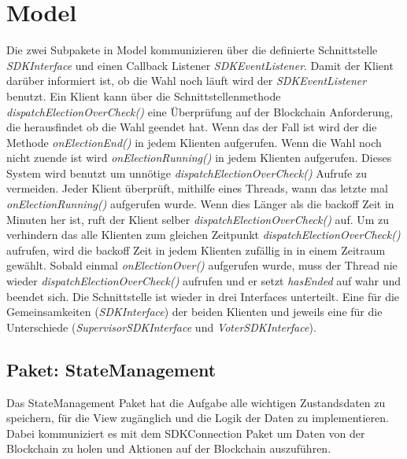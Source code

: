 \documentclass[parskip=full]{scrartcl}
\newcommand{\textitx}[1]{\mbox{\textit{#1}}}
\begin{document}
	\section{Model}
	\pagestyle{plain}
	Die zwei Subpakete in Model kommunizieren über die definierte Schnittstelle \textitx{SDKInterface} und einen Callback Listener \textitx{SDKEventListener}. 
	Damit der Klient darüber informiert ist, ob die Wahl noch läuft wird der \textitx{SDKEventListener} benutzt. Ein Klient kann über die Schnittstellenmethode \textitx{dispatchElectionOverCheck()} eine Überprüfung auf der Blockchain Anforderung, die herausfindet ob die Wahl geendet hat. Wenn das der Fall ist wird der die Methode \textitx{onElectionEnd()} in jedem Klienten aufgerufen. Wenn die Wahl noch nicht zuende ist wird \textitx{onElectionRunning()} in jedem Klienten aufgerufen. Dieses System wird benutzt um unnötige \textitx{dispatchElectionOverCheck()} Aufrufe zu vermeiden. Jeder Klient überprüft, mithilfe eines Threads, wann das letzte mal \textitx{onElectionRunning()} aufgerufen wurde. Wenn dies Länger als die backoff Zeit in Minuten her ist, ruft der Klient selber \textitx{dispatchElectionOverCheck()} auf. Um zu verhindern das alle Klienten zum gleichen Zeitpunkt \textitx{dispatchElectionOverCheck()} aufrufen, wird die backoff Zeit in jedem Klienten zufällig in in einem Zeitraum gewählt. Sobald einmal \textitx{onElectionOver()} aufgerufen wurde, muss der Thread nie wieder \textitx{dispatchElectionOverCheck()} aufrufen und er setzt \textitx{hasEnded} auf wahr und beendet sich.
	Die Schnittstelle ist wieder in drei Interfaces unterteilt. Eine für die Gemeinsamkeiten (\textitx{SDKInterface}) der beiden Klienten und jeweils eine für die Unterschiede (\textitx{SupervisorSDKInterface} und \textitx{VoterSDKInterface}).

	\subsection{Paket: StateManagement}
	Das StateManagement Paket hat die Aufgabe alle wichtigen Zustandsdaten zu speichern, für die View zugänglich und die Logik der Daten zu implementieren.
	Dabei kommuniziert es mit dem SDKConnection Paket um Daten von der Blockchain zu holen und Aktionen auf der Blockchain auszuführen.
	
\end{document}
